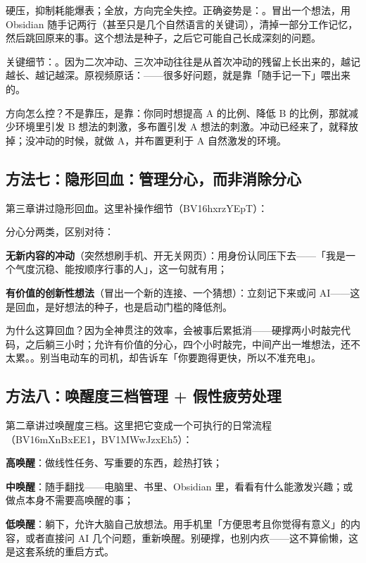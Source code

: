 硬压，抑制耗能爆表；全放，方向完全失控。正确姿势是：。冒出一个想法，用 Obsidian 随手记两行（甚至只是几个自然语言的关键词），清掉一部分工作记忆，然后跳回原来的事。这个想法是种子，之后它可能自己长成深刻的问题。

关键细节：。因为二次冲动、三次冲动往往是从首次冲动的残留上长出来的，越记越长、越记越深。原视频原话：——很多好问题，就是靠「随手记一下」喂出来的。

方向怎么控？不是靠压，是靠：你同时想提高 A 的比例、降低 B 的比例，那就减少环境里引发 B 想法的刺激，多布置引发 A 想法的刺激。冲动已经来了，就释放掉；没冲动的时候，就做 A，并布置更利于 A 自然激发的环境。

\subsection{方法七：隐形回血：管理分心，而非消除分心}

第三章讲过隐形回血。这里补操作细节（BV16hxrzYEpT）：

分心分两类，区别对待：

\begin{checklist}
  \item \textbf{无新内容的冲动}（突然想刷手机、开无关网页）：用身份认同压下去——「我是一个气度沉稳、能按顺序行事的人」，这一句就有用；
  \item \textbf{有价值的创新性想法}（冒出一个新的连接、一个猜想）：立刻记下来或问 AI——这是回血，是好想法的种子，也是启动门槛的降低剂。
\end{checklist}

为什么这算回血？因为全神贯注的效率，会被事后累抵消——硬撑两小时敲完代码，之后躺三小时；允许有价值的分心，四个小时敲完，中间产出一堆想法，还不太累。。别当电动车的司机，却告诉车「你要跑得更快，所以不准充电」。

\subsection{方法八：唤醒度三档管理 + 假性疲劳处理}

第二章讲过唤醒度三档。这里把它变成一个可执行的日常流程（BV16mXnBxEE1，BV1MWwJzxEh5）：

\begin{checklist}
  \item \textbf{高唤醒}：做线性任务、写重要的东西，趁热打铁；
  \item \textbf{中唤醒}：随手翻找——电脑里、书里、Obsidian 里，看看有什么能激发兴趣；或做点本身不需要高唤醒的事；
  \item \textbf{低唤醒}：躺下，允许大脑自己放想法。用手机里「方便思考且你觉得有意义」的内容，或者直接问 AI 几个问题，重新唤醒。别硬撑，也别内疚——这不算偷懒，这是这套系统的重启方式。
\end{checklist}

